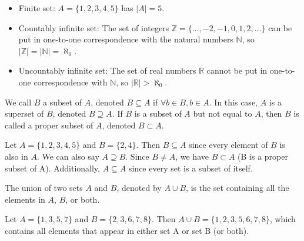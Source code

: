 \documentclass[12pt]{article}
\begin{document}
\begin{example}

    \begin{itemize}
        There are three examples of sets commonly used in mathmatics:
        \item Finite set: $A = \{1, 2, 3, 4, 5\}$ has $|A| = 5$.
        \item Countably infinite set: The set of integers $\mathbb{Z} = \{\ldots, -2, -1, 0, 1, 2, \ldots\}$ can be put in one-to-one correspondence with the natural numbers $\mathbb{N}$, so $|\mathbb{Z}| = |\mathbb{N}| = \aleph_0$.
        \item Uncountably infinite set: The set of real numbers $\mathbb{R}$ cannot be put in one-to-one correspondence with $\mathbb{N}$, so $|\mathbb{R}| > \aleph_0$.
    \end{itemize}
\end{example}



\vspace{12pt}


\begin{definition}
    We call $B$ a subset of $A$, denoted $B \subseteq A$ if $\forall b \in B, b \in A$. In this case, $A$ is a superset of $B$, denoted $B \supseteq A$. If $B$ is a subset of $A$ but not equal to $A$, then $B$ is called a proper subset of $A$, denoted $B \subset A$.
\end{definition}


Let $A = \{1, 2, 3, 4, 5\}$ and $B = \{2, 4\}$. Then $B \subseteq A$ since every element of $B$ is also in $A$. We can also say $A \supseteq B$. Since $B \neq A$, we have $B \subset A$ (B is a proper subset of A). Additionally, $A \subseteq A$ since every set is a subset of itself.


\vspace{12pt}


\begin{definition}[Union]
    The union of two sets $A$ and $B$, denoted by $A \cup B$, is the set containing all the elements in $A$, $B$, or both. 
\end{definition}

Let $A = \{1, 3, 5, 7\}$ and $B = \{2, 3, 6, 7, 8\}$. Then $A \cup B = \{1, 2, 3, 5, 6, 7, 8\}$, which contains all elements that appear in either set A or set B (or both).



\vspace{12pt}
\end{document}
